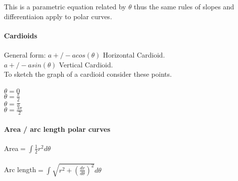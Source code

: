 \documentclass[14pt]{extreport}
\begin{document}
This is a parametric equation related by $\theta$ thus the same rules of slopes and differentiaion apply to polar curves.\\\\

\textbf{Cardioids}\\\\

General form:
	$a +/- acos(\theta)$ Horizontal Cardioid.\\
	$a +/- asin(\theta)$ Vertical Cardioid.\\


To sketch the graph of a cardioid consider these points.\\\\
$\theta = 0$\\
$\theta = \frac{\pi}{2}$\\
$\theta = \pi$\\
$\theta = \frac{3\pi}{2}$\\\\

\textbf{Area / arc length polar curves}\\\\

Area$= \int \frac{1}{2} r^2 d\theta$\\\\
Arc length$= \int \sqrt{r^2 + (\frac{dr}{d\theta})^2} d\theta$\\\\
\end{document}
